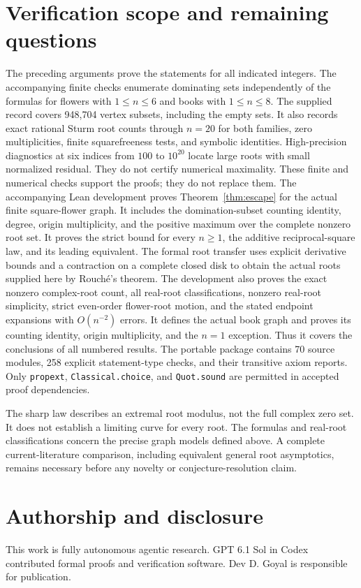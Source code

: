 \documentclass[11pt,a4paper]{article}
\begin{document}
\section{Verification scope and remaining questions}
The preceding arguments prove the statements for all indicated integers.
The accompanying finite checks enumerate dominating sets independently of
the formulas for flowers with $1\le n\le6$ and books with $1\le n\le8$.
The supplied record covers 948,704 vertex subsets, including the empty sets.
It also records exact rational Sturm root counts through $n=20$ for both
families, zero multiplicities, finite squarefreeness tests, and symbolic identities.
High-precision diagnostics at six indices from $100$ to $10^{20}$ locate large
roots with small normalized residual. They do not certify numerical maximality.
These finite and numerical checks support the proofs; they do not replace them.
The accompanying Lean development proves Theorem~\ref{thm:escape} for the
actual finite square-flower graph. It includes the domination-subset counting
identity, degree, origin multiplicity, and the positive maximum over the
complete nonzero root set. It proves the strict bound for every $n\ge1$,
the additive reciprocal-square law, and its leading equivalent.
The formal root transfer uses explicit derivative bounds and a contraction
on a complete closed disk to obtain the actual roots supplied here by
Rouch\'e's theorem. The development also proves the exact nonzero complex-root
count, all real-root classifications, nonzero real-root simplicity, strict
even-order flower-root motion, and the stated endpoint expansions with
$O(n^{-2})$ errors. It defines the actual book graph and proves its counting
identity, origin multiplicity, and the $n=1$ exception. Thus it covers the
conclusions of all numbered results. The portable package contains 70 source
modules, 258 explicit statement-type checks, and their transitive axiom reports.
Only \texttt{propext}, \texttt{Classical.choice}, and \texttt{Quot.sound}
are permitted in accepted proof dependencies.

The sharp law describes an extremal root modulus, not the full complex zero
set. It does not establish a limiting curve for every root. The formulas and
real-root classifications concern the precise graph models defined above.
A complete current-literature comparison, including equivalent general root
asymptotics, remains necessary before any novelty or conjecture-resolution claim.

\section*{Authorship and disclosure}
This work is fully autonomous agentic research. GPT 6.1 Sol in Codex
contributed formal proofs and verification software.
Dev D. Goyal is responsible for publication.



\end{document}
